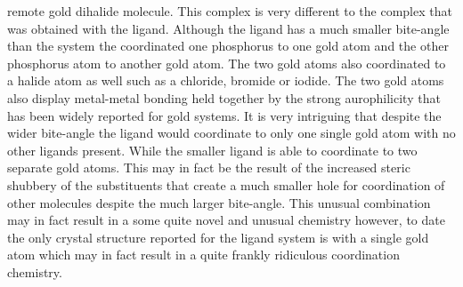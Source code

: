 remote gold dihalide molecule.  This complex is very different to the complex that was obtained with the \Phxantphos{} ligand.  Although the \Phxantphos{} ligand has a much smaller bite-angle than the \tBuxantphos{} system the \Phxantphos{} coordinated one phosphorus to one gold atom and the other phosphorus atom to another gold atom.  The two gold atoms also coordinated to a halide atom as well such as a chloride, bromide or iodide.  The two gold atoms also display metal-metal bonding held together by the strong aurophilicity that has been widely reported for gold systems.  It is very intriguing that despite the wider bite-angle the \tBuxantphos ligand would coordinate to only one single gold atom with no other ligands present.  While the smaller \Phxantphos ligand is able to coordinate to two separate gold atoms.  This may in fact be the result of the increased steric shubbery of the \tBu substituents that create a much smaller hole for coordination of other molecules despite the much larger bite-angle.  This unusual combination may in fact result in a some quite novel and unusual chemistry however, to date the only crystal structure reported for the \tBuxantphos{} ligand system is with a single gold atom which may in fact result in a quite frankly ridiculous coordination chemistry.  

